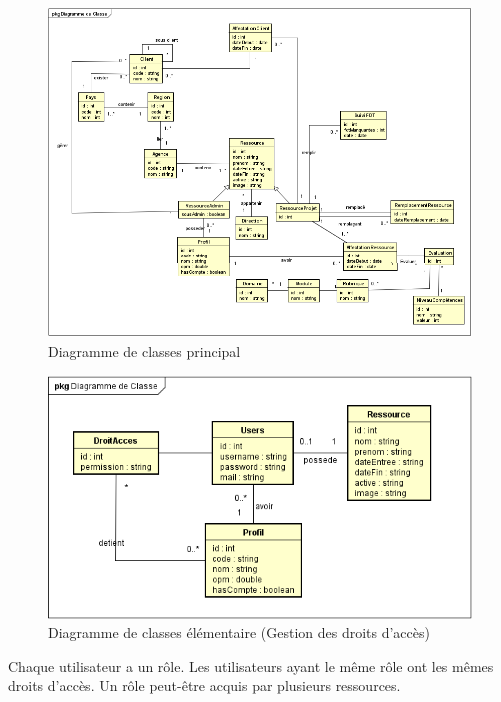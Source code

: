 \newpage
\begin{figure}[h!]
 \centering
     \includegraphics[width=1.4\textwidth,angle=90]{chapitre4/Figures/classes.png}
\caption{Diagramme de classes principal}
\end{figure}%
\newpage
\begin{figure}[h!]  
 \centering
    \includegraphics{chapitre4/Figures/cnx.png}
  \caption{Diagramme de classes élémentaire (Gestion des droits d’accès)}
\end{figure}

Chaque utilisateur a un rôle. Les utilisateurs ayant le même rôle ont les mêmes droits d'accès. Un rôle peut-être acquis par plusieurs ressources.